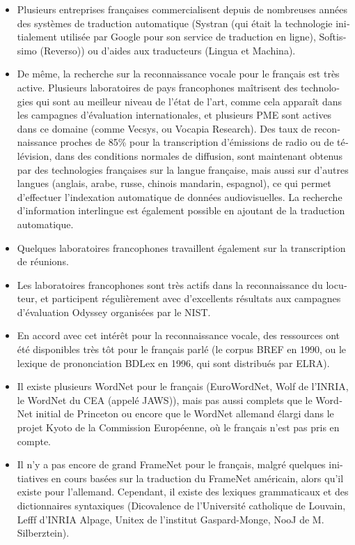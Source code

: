 \begin{french}
\begin{multicols}{2}
\begin{itemize}
\item Plusieurs entreprises françaises commercialisent depuis de nombreuses
années des systèmes de traduction automatique (Systran (qui était la
technologie initialement utilisée par Google pour son service de
traduction en ligne), Softissimo (Reverso)) ou d'aides aux traducteurs
(Lingua et Machina).

\item De même, la recherche sur la reconnaissance vocale pour le français est très active.
Plusieurs laboratoires de pays francophones maîtrisent des technologies qui sont au
meilleur niveau de l'état de l'art, comme cela apparaît dans les
campagnes d'évaluation internationales, et plusieurs PME sont actives
dans ce domaine (comme Vecsys, ou Vocapia Research). Des taux de
reconnaissance proches de 85\% pour la transcription d'émissions de
radio ou de télévision, dans des conditions normales de diffusion,
sont maintenant obtenus par des technologies françaises sur la langue
française, mais aussi sur d'autres langues (anglais, arabe, russe,
chinois mandarin, espagnol), ce qui permet d'effectuer l'indexation automatique
de données audiovisuelles. La recherche d'information interlingue est
également possible en ajoutant de la traduction automatique.

\item Quelques laboratoires francophones travaillent également sur la transcription de réunions.

\item Les laboratoires francophones sont très actifs dans la reconnaissance du
locuteur, et participent régulièrement avec d'excellents résultats aux
campagnes d'évaluation Odyssey organisées par le NIST.

\item En accord avec cet intérêt pour la reconnaissance vocale, des
ressources ont été disponibles très tôt pour le français parlé (le
corpus BREF en 1990, ou le lexique de prononciation BDLex en 1996, qui
sont distribués par ELRA).

\item Il existe plusieurs WordNet pour le français (EuroWordNet, Wolf
  de l'INRIA, le WordNet du CEA (appelé JAWS)), mais pas aussi
  complets que le WordNet initial de Princeton ou encore que le
  WordNet allemand élargi dans le projet Kyoto de la Commission
  Européenne, où le français n'est pas pris en compte.

\item Il n'y a pas encore de grand FrameNet pour le français, malgré
quelques initiatives en cours basées sur la traduction du FrameNet
américain, alors qu'il existe pour l'allemand. Cependant, il existe
des lexiques grammaticaux et des dictionnaires syntaxiques
(Dicovalence de l'Université catholique de Louvain, Lefff d'INRIA
Alpage, Unitex de l'institut Gaspard-Monge, NooJ de M. Silberztein).


\end{itemize}
\end{multicols}
\end{french}
